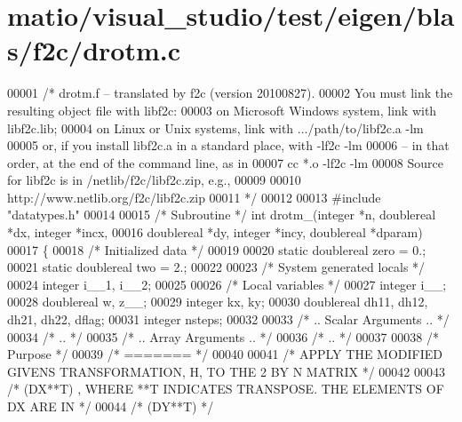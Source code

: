\hypertarget{matio_2visual__studio_2test_2eigen_2blas_2f2c_2drotm_8c_source}{}\section{matio/visual\+\_\+studio/test/eigen/blas/f2c/drotm.c}
\label{matio_2visual__studio_2test_2eigen_2blas_2f2c_2drotm_8c_source}

\begin{DoxyCode}
00001 \textcolor{comment}{/* drotm.f -- translated by f2c (version 20100827).}
00002 \textcolor{comment}{   You must link the resulting object file with libf2c:}
00003 \textcolor{comment}{    on Microsoft Windows system, link with libf2c.lib;}
00004 \textcolor{comment}{    on Linux or Unix systems, link with .../path/to/libf2c.a -lm}
00005 \textcolor{comment}{    or, if you install libf2c.a in a standard place, with -lf2c -lm}
00006 \textcolor{comment}{    -- in that order, at the end of the command line, as in}
00007 \textcolor{comment}{        cc *.o -lf2c -lm}
00008 \textcolor{comment}{    Source for libf2c is in /netlib/f2c/libf2c.zip, e.g.,}
00009 \textcolor{comment}{}
00010 \textcolor{comment}{        http://www.netlib.org/f2c/libf2c.zip}
00011 \textcolor{comment}{*/}
00012 
00013 \textcolor{preprocessor}{#include "datatypes.h"}
00014 
00015 \textcolor{comment}{/* Subroutine */} \textcolor{keywordtype}{int} drotm\_(integer *n, doublereal *dx, integer *incx, 
00016     doublereal *dy, integer *incy, doublereal *dparam)
00017 \{
00018     \textcolor{comment}{/* Initialized data */}
00019 
00020     \textcolor{keyword}{static} doublereal zero = 0.;
00021     \textcolor{keyword}{static} doublereal two = 2.;
00022 
00023     \textcolor{comment}{/* System generated locals */}
00024     integer i\_\_1, i\_\_2;
00025 
00026     \textcolor{comment}{/* Local variables */}
00027     integer i\_\_;
00028     doublereal w, z\_\_;
00029     integer kx, ky;
00030     doublereal dh11, dh12, dh21, dh22, dflag;
00031     integer nsteps;
00032 
00033 \textcolor{comment}{/*     .. Scalar Arguments .. */}
00034 \textcolor{comment}{/*     .. */}
00035 \textcolor{comment}{/*     .. Array Arguments .. */}
00036 \textcolor{comment}{/*     .. */}
00037 
00038 \textcolor{comment}{/*  Purpose */}
00039 \textcolor{comment}{/*  ======= */}
00040 
00041 \textcolor{comment}{/*     APPLY THE MODIFIED GIVENS TRANSFORMATION, H, TO THE 2 BY N MATRIX */}
00042 
00043 \textcolor{comment}{/*     (DX**T) , WHERE **T INDICATES TRANSPOSE. THE ELEMENTS OF DX ARE IN */}
00044 \textcolor{comment}{/*     (DY**T) */}

\end{DoxyCode}
